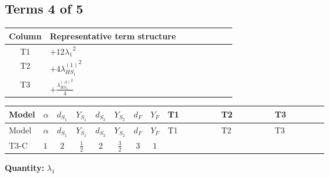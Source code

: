 \documentclass[8pt]{article}
\begin{document}
\begin{landscape}
\subsection*{Terms 4 of 5}
\begin{center}
\begin{tabular}{@{}c >{\raggedright\arraybackslash}p{0.82\linewidth}@{}}
\toprule
Column & Representative term structure \\
\midrule
T1 & \(\displaystyle +12 {\lambda_1}^2\) \\
\midrule
T2 & \(\displaystyle +4 {\lambda_{HS_1}^{(1)}}^2\) \\
\midrule
T3 & \(\displaystyle +\frac{{\lambda_{HS_1}^{(A)}}^2}{4}\) \\
\midrule
\bottomrule
\end{tabular}
\end{center}
\smallskip
\tiny
\begin{longtable}{@{}llcccccc >{\raggedright\arraybackslash}p{0.21\linewidth} >{\raggedright\arraybackslash}p{0.21\linewidth} >{\raggedright\arraybackslash}p{0.21\linewidth}@{}}
\toprule
Model & $\alpha$ & $d_{S_1}$ & $Y_{S_1}$ & $d_{S_2}$ & $Y_{S_2}$ & $d_F$ & $Y_F$ & T1 & T2 & T3 \\
\midrule
\endfirsthead
\toprule
Model & $\alpha$ & $d_{S_1}$ & $Y_{S_1}$ & $d_{S_2}$ & $Y_{S_2}$ & $d_F$ & $Y_F$ & T1 & T2 & T3 \\
\midrule
\endhead
T3-C & $1$ & $2$ & $\frac{1}{2}$ & $2$ & $\frac{3}{2}$ & $3$ & $1$ & \scriptsize\adjustbox{max width=\linewidth}{$\begin{gathered} +12 {\lambda_1}^2\end{gathered}$} & \scriptsize\adjustbox{max width=\linewidth}{$\begin{gathered} +4 {\lambda_{HS_1}^{(1)}}^2\end{gathered}$} & \scriptsize\adjustbox{max width=\linewidth}{$\begin{gathered} +\frac{{\lambda_{HS_1}^{(A)}}^2}{4}\end{gathered}$} \\
\midrule
\bottomrule
\end{longtable}
\clearpage
\noindent\textbf{Quantity: }$\lambda_1$\par\smallskip

\end{landscape}
\end{document}
